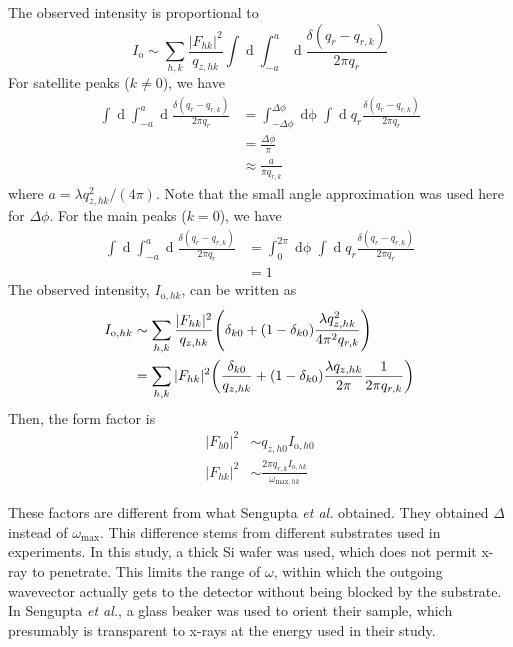 \documentclass[12pt,letterpaper]{article}
\begin{document}
The observed intensity is proportional to
\begin{equation}
  I_{\mathrm{o}} \sim \sum_{h,k} \frac{\lvert F_{hk} \rvert^2}{q_{z,hk}} \int\mathop{dq_x} 
                      \int_{-a}^{a}\mathop{dq_y} \frac{\delta(q_r-q_{r,k})}{2\pi q_r}
\end{equation}
For satellite peaks ($k \neq 0$), we have 
\begin{align}
  \int\mathop{dq_x} \int_{-a}^a\mathop{dq_y} \frac{\delta(q_r-q_{r,k})}{2\pi q_r}
  &= \int_{-\Delta\phi}^{\Delta\phi}\mathop{d\phi} \int\mathop{dq_r} q_r\frac{\delta(q_r-q_{r,k})}{2\pi q_r} \\
  &= \frac{\Delta\phi}{\pi} \\
  &\approx \frac{a}{\pi q_{r,k}}
\end{align}
where $a=\lambda q_{z,hk}^2/(4\pi)$. Note that the small angle approximation was used here for $\Delta\phi$.
For the main peaks ($k=0$), we have 
\begin{align}
  \int\mathop{dq_x} \int_{-a}^a\mathop{dq_y} \frac{\delta(q_r-q_{r,k})}{2\pi q_r}
  &= \int_0^{2\pi}\mathop{d\phi} \int\mathop{dq_r} q_r\frac{\delta(q_r-q_{r,k})}{2\pi q_r} \\
  &= 1
\end{align}
The observed intensity, $I_{\mathrm{o},hk}$, can be written as
\begin{align}
  I_{\mathrm{o},hk} &\sim \sum_{h,k} \frac{|F_{hk}|^2}{q_{z,hk}}
                    \mathopen{}\left( \delta_{k0}+(1-\delta_{k0})\frac{\lambda q_{z,hk}^2}{4\pi^2 q_{r,k}} \right)\mathclose{} \\
  &= \sum_{h,k}|F_{hk}|^2 \mathopen{}\left( \frac{\delta_{k0}}{q_{z,hk}}+(1-\delta_{k0})\frac{\lambda q_{z,hk}}{2\pi}
  \frac{1}{2\pi q_{r,k}} \right)\mathclose{}
\end{align}
Then, the form factor is 
\begin{align}
  |F_{h0}|^2 &\sim q_{z,h0} I_{\mathrm{o},h0} \\
  |F_{hk}|^2 &\sim \frac{2\pi q_{r,k} I_{\mathrm{o},hk}}{\omega_{\mathrm{max},hk}} 
\end{align}

These factors are different from what Sengupta \textit{et al.} obtained. They
obtained $\Delta$ instead of $\omega_{\text{max}}$. This difference stems from
different substrates used in experiments. In this study, a thick Si wafer
was used, which does not permit x-ray to penetrate. This limits the range
of $\omega$, within which the outgoing wavevector actually gets to the
detector without being blocked by the substrate. In Sengupta \textit{et al.},
a glass beaker was used to orient their sample, which presumably is
transparent to x-rays at the energy used in their study. 
\end{document}
